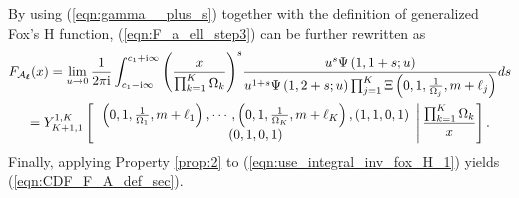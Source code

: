 \documentclass[12pt,onecolumn,draftcls]{IEEEtran}
\newcommand{\bs}{\boldsymbol}
\begin{document}
By using (\ref{eqn:gamma__plus_s}) together with the definition of generalized Fox's H function, (\ref{eqn:F_a_ell_step3}) can be further rewritten as
\begin{multline}\label{eqn:use_integral_inv_fox_H_1}
{F_{{{\cal A}_{\bs \ell} }}}(x) = \mathop {\lim }\limits_{u \to 0} \frac{1}{{2\pi {\rm i}}}\int_{c_1-{\rm i}\infty}^{c_1+{\rm i}\infty} {{{\left( {\frac{x}{{\prod\nolimits_{k = 1}^K {{\Omega _k}} }}} \right)}^s}\frac{{{u^s}\Psi \left( {1,1 + s;u} \right)}}{{{u^{1 + s}}\Psi \left( {1,2 + s;u} \right)\prod\nolimits_{j = 1}^K {\Xi \left( {0,1,\frac{1}{{{\Omega _j}}},m + {\ell _j}} \right)} }}ds} \\
 = Y_{K + 1,1}^{1,K}\left[ {\left. {\begin{array}{*{20}{c}}
{\left( {0,1,\frac{1}{{{\Omega _1}}},m + {\ell _1}} \right), \cdots ,\left( {0,1,\frac{1}{{{\Omega _K}}},m + {\ell _K}} \right),\left( {1,1,0,1} \right)}\\
{\left( {0,1,0,1} \right)}
\end{array}} \right|\frac{{\prod\nolimits_{k = 1}^K {{\Omega _k}} }}{x}} \right].
\end{multline}
Finally, applying Property \ref{prop:2} to (\ref{eqn:use_integral_inv_fox_H_1}) yields (\ref{eqn:CDF_F_A_def_sec}).

\end{document}
